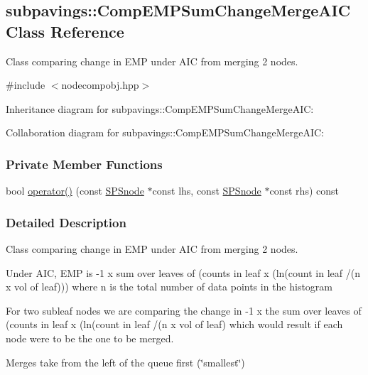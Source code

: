 \hypertarget{classsubpavings_1_1CompEMPSumChangeMergeAIC}{\subsection{subpavings\-:\-:\-Comp\-E\-M\-P\-Sum\-Change\-Merge\-A\-I\-C \-Class \-Reference}
\label{classsubpavings_1_1CompEMPSumChangeMergeAIC}
}


\-Class comparing change in \-E\-M\-P under \-A\-I\-C from merging 2 nodes.  




{\ttfamily \#include $<$nodecompobj.\-hpp$>$}



\-Inheritance diagram for subpavings\-:\-:\-Comp\-E\-M\-P\-Sum\-Change\-Merge\-A\-I\-C\-:


\-Collaboration diagram for subpavings\-:\-:\-Comp\-E\-M\-P\-Sum\-Change\-Merge\-A\-I\-C\-:
\subsubsection*{\-Private \-Member \-Functions}
\begin{DoxyCompactItemize}
\item 
bool \hyperlink{classsubpavings_1_1CompEMPSumChangeMergeAIC_a85af532940cbe2ccfdd277e2eea682eb}{operator()} (const \hyperlink{classsubpavings_1_1SPSnode}{\-S\-P\-Snode} $\ast$const lhs, const \hyperlink{classsubpavings_1_1SPSnode}{\-S\-P\-Snode} $\ast$const rhs) const 
\end{DoxyCompactItemize}


\subsubsection{\-Detailed \-Description}
\-Class comparing change in \-E\-M\-P under \-A\-I\-C from merging 2 nodes. 

\-Under \-A\-I\-C, \-E\-M\-P is -\/1 x sum over leaves of (counts in leaf x (ln(count in leaf /(n x vol of leaf))) where n is the total number of data points in the histogram

\-For two subleaf nodes we are comparing the change in -\/1 x the sum over leaves of (counts in leaf x (ln(count in leaf /(n x vol of leaf) which would result if each node were to be the one to be merged.

\-Merges take from the left of the queue first (\char`\"{}smallest\char`\"{})

